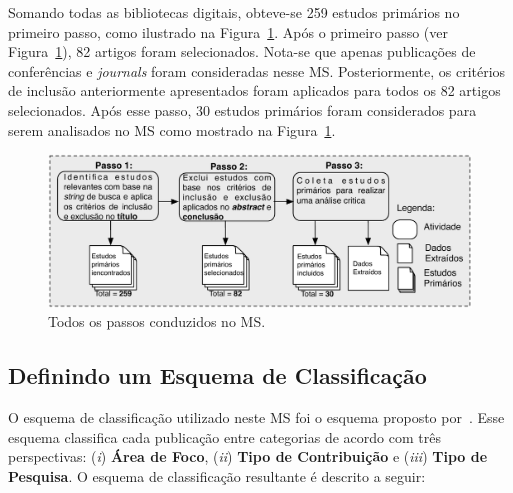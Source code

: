 Somando todas as bibliotecas digitais, obteve-se 259 estudos primários no primeiro passo, como ilustrado na Figura~\ref{fig:todos_os_passos}. Após o primeiro passo (ver Figura~\ref{fig:todos_os_passos}), 82 artigos foram selecionados. Nota-se que apenas publicações de conferências e \textit{journals} foram consideradas nesse MS. Posteriormente, os critérios de inclusão anteriormente apresentados foram aplicados para todos os 82 artigos selecionados. Após esse passo, 30 estudos primários foram considerados para serem analisados no MS como mostrado na Figura~\ref{fig:todos_os_passos}.

\begin{figure}[h]
 \caption{Todos os passos conduzidos no MS.}
 \label{fig:todos_os_passos}
 \centering
 \includegraphics[scale=0.7]{images/todosOsPassosMS}
 \fautor
\end{figure}

\subsection{Definindo um Esquema de Classificação}\label{subsec:definindo_esquema_de_classificacao}

O esquema de classificação utilizado neste MS foi o esquema proposto por~. Esse esquema classifica cada publicação entre categorias de acordo com três perspectivas: (\textit{i}) \textbf{Área de Foco}, (\textit{ii}) \textbf{Tipo de Contribuição} e (\textit{iii}) \textbf{Tipo de Pesquisa}. O esquema de classificação resultante é descrito a seguir:

